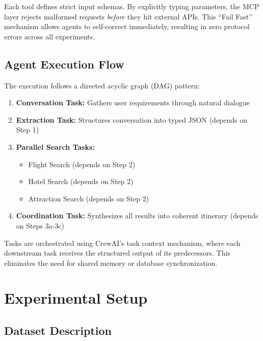 \documentclass[preprint,review,12pt]{elsarticle}
\begin{document}
Each tool defines strict input schemas. By explicitly typing parameters, the MCP layer rejects malformed requests \textit{before} they hit external APIs. This ``Fail Fast'' mechanism allows agents to self-correct immediately, resulting in zero protocol errors across all experiments.

\subsection{Agent Execution Flow}

The execution follows a directed acyclic graph (DAG) pattern:

\begin{enumerate}
    \item \textbf{Conversation Task:} Gathers user requirements through natural dialogue
    \item \textbf{Extraction Task:} Structures conversation into typed JSON (depends on Step 1)
    \item \textbf{Parallel Search Tasks:}
    \begin{itemize}
        \item Flight Search (depends on Step 2)
        \item Hotel Search (depends on Step 2)
        \item Attraction Search (depends on Step 2)
    \end{itemize}
    \item \textbf{Coordination Task:} Synthesizes all results into coherent itinerary (depends on Steps 3a-3c)
\end{enumerate}

Tasks are orchestrated using CrewAI's task context mechanism, where each downstream task receives the structured output of its predecessors. This eliminates the need for shared memory or database synchronization.

\section{Experimental Setup}
\label{sec:experimental}

\subsection{Dataset Description}
\end{document}
